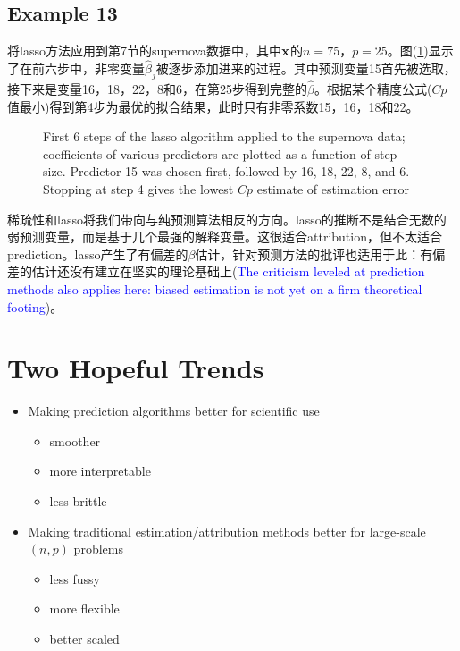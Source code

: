 \documentclass[lang=cn,11pt,a4paper,cite=authoryear]{elegantpaper}
\begin{document}
\subsection{Example 13}

将lasso方法应用到第7节的supernova数据中，其中$\bold{x}$的$n=75$，$p=25$。图(\ref{fig15})显示了在前六步中，非零变量$\hat{\beta}_j$被逐步添加进来的过程。其中预测变量15首先被选取，接下来是变量16，18，22，8和6，在第25步得到完整的$\hat{\beta}$。根据某个精度公式($Cp$值最小)得到第4步为最优的拟合结果，此时只有非零系数15，16，18和22。


\begin{figure}[H]
		\centering
		\caption{First 6 steps of the lasso algorithm applied to the supernova data; coefficients of various predictors are plotted as a function of step size. Predictor 15 was chosen first, followed by 16, 18, 22, 8, and 6. Stopping at step 4 gives the lowest $Cp$ estimate of estimation error}
		\label{fig15}
\end{figure}

稀疏性和lasso将我们带向与纯预测算法相反的方向。lasso的推断不是结合无数的弱预测变量，而是基于几个最强的解释变量。这很适合attribution，但不太适合prediction。lasso产生了有偏差的$\beta$估计，针对预测方法的批评也适用于此：有偏差的估计还没有建立在坚实的理论基础上(\textcolor{blue}{The criticism leveled at prediction methods also applies here: biased estimation is not yet on a firm theoretical footing})。

\section{Two Hopeful Trends}

\begin{itemize}
	\item Making prediction algorithms better for scientific use
	\begin{itemize}
		\item smoother
		\item more interpretable
		\item less brittle
	\end{itemize}
	\item Making traditional estimation/attribution methods better for large-scale $(n, p)$ problems
	\begin{itemize}
		\item less fussy
		\item more flexible
		\item better scaled
	\end{itemize}
\end{itemize}



\newpage


\newpage
\appendix
\end{document}
